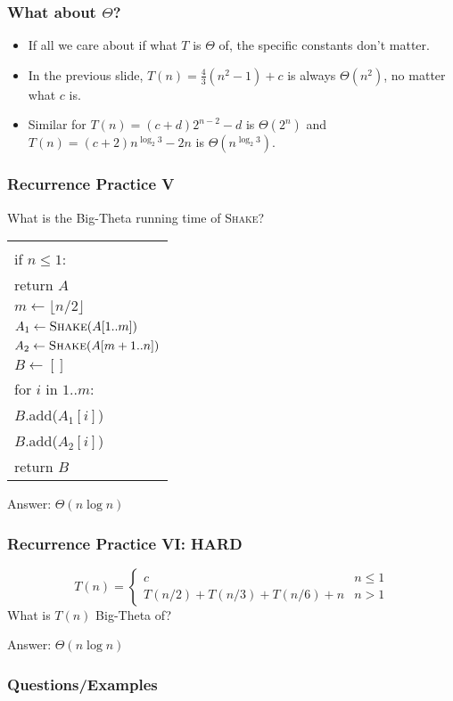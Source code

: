 \documentclass{beamer}
\newcommand{\xbeginlgox}{\begin{minipage}{1in}\begin{tabbing}
  \quad\=\qquad\=\qquad\=\qquad\=\qquad\=\qquad\=\qquad\=\kill}
\newcommand{\xendlgox}{\end{tabbing}\end{minipage}}
\newenvironment{algorithm}{\begin{tabular}{|l|}\hline\xbeginlgox}
  {\xendlgox\\\hline\end{tabular}}
\begin{document}
\begin{frame}
  \frametitle{What about $\Theta$?}
  \begin{itemize}[<+->]
    \item If all we care about if what $T$ is $\Theta$ of, the specific constants don't matter.
    \item In the previous slide, $T(n) = \frac43(n^2 - 1) + c$ is always $\Theta(n^2)$, no matter what $c$ is.
    \item Similar for $T(n) = (c + d)2^{n - 2} - d$ is $\Theta(2^n)$ and $T(n) = (c + 2)n^{\log_2 3} - 2n$ is $\Theta(n^{\log_2 3})$.
  \end{itemize}
  
\end{frame}

\begin{frame}[t]
  \frametitle{Recurrence Practice V}
  What is the Big-Theta running time of \textsc{Shake}?

  \begin{algorithm}
  \textsc{Shake}($A[1..n]$)\+
  \\ if $n \leq 1$:\+
  \\   return $A$\-
  \\ $m \gets \lfloor n / 2 \rfloor$
  \\ $A_1 \gets \textsc{Shake}(A[1..m])$
  \\ $A_2 \gets \textsc{Shake}(A[m+1..n])$
  \\ $B \gets []$
  \\ for $i$ in $1..m$:\+
  \\   $B$.add($A_1[i]$)
  \\   $B$.add($A_2[i]$)\-
  \\ return $B$
  \end{algorithm}

  \vfill
  \vfill
  \vfill

  \pause

  Answer: $\Theta(n\log n)$
\end{frame}

\begin{frame}[t]
  \frametitle{Recurrence Practice VI: HARD}
  \begin{equation*}
    T(n) = \begin{cases}
    c & n \leq 1 \\
    T(n/2) + T(n/3) + T(n/6) + n & n > 1
    \end{cases}
  \end{equation*}
  What is $T(n)$ Big-Theta of?
  \vfill
  \vfill
  \vfill
  \vfill

  \pause

  Answer: $\Theta(n\log n)$
\end{frame}

\begin{frame}
  \frametitle{Questions/Examples}
  \pause
  \pause
  \pause
\end{frame}
\end{document}
